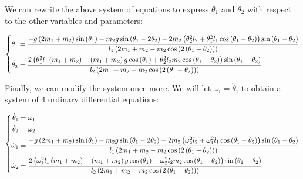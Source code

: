 We can rewrite the above system of equations to express $\ddot{\theta}_1$ and $\ddot{\theta}_2$ with respect to the other variables and parameters:

\begin{equation*}
    \begin{dcases}
        \begin{aligned}
            \ddot{\theta}_1 &= \frac{-g\left(2m_1 + m_2\right)\sin\left(\theta_1\right) - m_2g\sin\left(\theta_1 - 2\theta_2\right) - 2m_2\left(\dot{\theta}_2^2l_2 + \dot{\theta}_1^2l_1\cos\left(\theta_1 - \theta_2\right)\right)\sin\left(\theta_1 - \theta_2\right)}{l_1\left(2m_1 + m_2 - m_2\cos\left(2\left(\theta_1 - \theta_2\right)\right)\right)}\\
            \ddot{\theta}_2 &= \frac{2\left(\dot{\theta}_1^2l_1\left(m_1 + m_2\right)+\left(m_1 + m_2\right)g\cos\left(\theta_1\right) + \dot{\theta}_2^2l_2m_2\cos\left(\theta_1 - \theta_2\right)\right)\sin\left(\theta_1 - \theta_2\right)}{l_2\left(2m_1 + m_2 - m_2\cos\left(2\left(\theta_1 - \theta_2\right)\right)\right)}
        \end{aligned}
    \end{dcases}
\end{equation*}

Finally, we can modify the system once more. We will let $\omega_i=\dot{\theta}_i$ to obtain a system of 4 ordinary differential equations:

\begin{equation}
    \begin{dcases}
        \begin{aligned}
            \dot{\theta}_1 &= \omega_1\\
            \dot{\theta}_2 &= \omega_2\\
            \dot{\omega}_1 &= \frac{-g\left(2m_1 + m_2\right)\sin\left(\theta_1\right) - m_2g\sin\left(\theta_1 - 2\theta_2\right) - 2m_2\left(\omega_2^2l_2 + \omega_1^2l_1\cos\left(\theta_1 - \theta_2\right)\right)\sin\left(\theta_1 - \theta_2\right)}{l_1\left(2m_1 + m_2 - m_2\cos\left(2\left(\theta_1 - \theta_2\right)\right)\right)}\\
            \dot{\omega}_2 &= \frac{2\left(\omega_1^2l_1\left(m_1 + m_2\right)+\left(m_1 + m_2\right)g\cos\left(\theta_1\right) + \omega_2^2l_2m_2\cos\left(\theta_1 - \theta_2\right)\right)\sin\left(\theta_1 - \theta_2\right)}{l_2\left(2m_1 + m_2 - m_2\cos\left(2\left(\theta_1 - \theta_2\right)\right)\right)}
        \end{aligned}
    \end{dcases}
    \label{eq:system-of-equations}
\end{equation}
